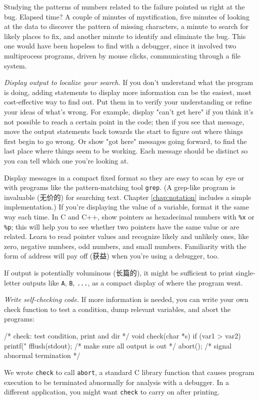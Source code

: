 Studying the patterns of numbers related to the failure pointed us right at
the bug. Elapsed time? A couple of minutes of mystification, five minutes
of looking at the data to discover the pattern of missing characters, a
minute to search for likely places to fix, and another minute to identify
and eliminate the bug. This one would have been hopeless to find with a
debugger, since it involved two multiprocess programs, driven by mouse
clicks, communicating through a file system.

\emph{Display output to localize your search.} If you don't understand what
the program is doing, adding statements to display more information can be
the easiest, most cost-effective way to find out. Put them in to verify
your understanding or refine your ideas of what's wrong. For example,
display "can't get here" if you think it's not possible to reach a certain
point in the code; then if you see that message, move the output statements
back towards the start to figure out where things first begin to go wrong.
Or show "got here" messages going forward, to find the last place where
things seem to be working. Each message should be distinct so you can tell
which one you're looking at.

Display messages in a compact fixed format so they are easy to scan by eye
or with programs like the pattern-matching tool \verb'grep'. (A grep-like
program is invaluable (无价的) for searching text. Chapter
\ref{chap:notation} includes a simple implementation.) If you're displaying
the value of a variable, format it the same way each time. In C and C++,
show pointers as hexadecimal numbers with \verb'%x' or \verb'%p'; this will
help you to see whether two pointers have the same value or are related.
Learn to read pointer values and recognize likely and unlikely ones, like
zero, negative numbers, odd numbers, and small numbers. Familiarity with
the form of address will pay off (获益) when you're using a debugger, too.

If output is potentially voluminous (长篇的), it might be sufficient to
print single-letter outputs like \verb'A', \verb'B', \verb'...', as a
compact display of where the program went.

\emph{Write self-checking code.} If more information is needed, you can
write your own check function to test a condition, dump relevant variables,
and abort the programs:
\begin{wellcode}
    /* check: test condition, print and dir */
    void check(char *s)
    {
        if (var1 > var2) {
            printf("%
            fflush(stdout); /* make sure all output is out */
            abort();        /* signal abnormal termination */
        }
    }
\end{wellcode}
We wrote \verb'check' to call \verb'abort', a standard C library function
that causes program execution to be terminated abnormally for analysis with
a debugger. In a different application, you might want \verb'check' to
carry on after printing.

